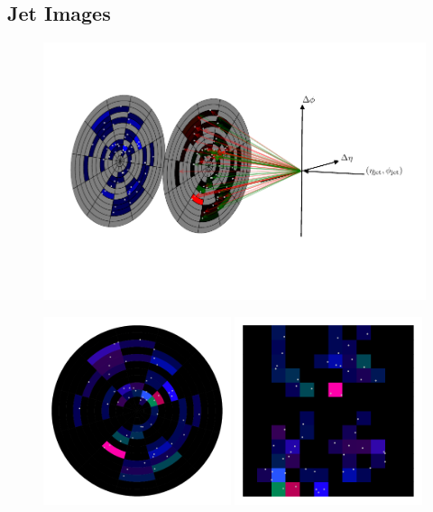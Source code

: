 \subsection{Jet Images}

\begin{figure}[h!]

    \includegraphics[width=\textwidth]{figures/event_selection/jet_diagram_RGB.pdf}
    \begin{center}
        \includegraphics[width=0.49\textwidth]{figures/event_selection/full_image_polar.pdf}
        \includegraphics[width=0.49\textwidth]{figures/event_selection/full_image_rect.pdf}
    \end{center}


\end{figure}
